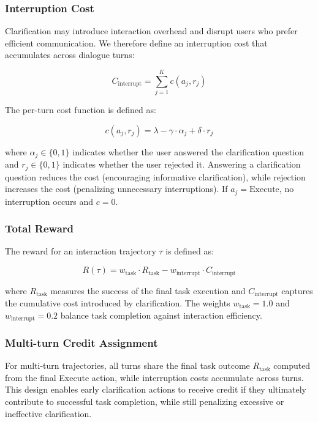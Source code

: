 \subsubsection{Interruption Cost}

Clarification may introduce interaction overhead and disrupt users who prefer efficient communication. We therefore define an interruption cost that accumulates across dialogue turns:

\begin{equation}
C_{\text{interrupt}} = \sum_{j=1}^{K} c(a_j, r_j)
\end{equation}

The per-turn cost function is defined as:

\begin{equation}
c(a_j, r_j) = \lambda - \gamma \cdot \alpha_j + \delta \cdot r_j
\end{equation}

where $\alpha_j \in \{0, 1\}$ indicates whether the user answered the clarification question and $r_j \in \{0, 1\}$ indicates whether the user rejected it. Answering a clarification question reduces the cost (encouraging informative clarification), while rejection increases the cost (penalizing unnecessary interruptions). If $a_j = \text{Execute}$, no interruption occurs and $c = 0$.

\subsubsection{Total Reward}

The reward for an interaction trajectory $\tau$ is defined as:

\begin{equation}
R(\tau) = w_{\text{task}} \cdot R_{\text{task}} - w_{\text{interrupt}} \cdot C_{\text{interrupt}}
\end{equation}

where $R_{\text{task}}$ measures the success of the final task execution and $C_{\text{interrupt}}$ captures the cumulative cost introduced by clarification. The weights $w_{\text{task}} = 1.0$ and $w_{\text{interrupt}} = 0.2$ balance task completion against interaction efficiency.

\subsubsection{Multi-turn Credit Assignment}
\label{sec:traj-reward}

For multi-turn trajectories, all turns share the final task outcome $R_{\text{task}}$ computed from the final Execute action, while interruption costs accumulate across turns. This design enables early clarification actions to receive credit if they ultimately contribute to successful task completion, while still penalizing excessive or ineffective clarification.

